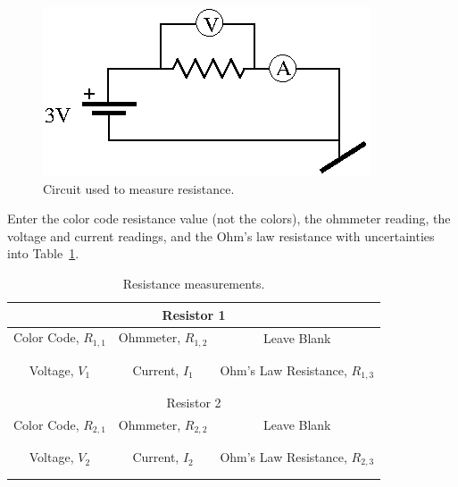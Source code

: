 \begin{figure}[htb]
\centering \epsfxsize=6cm \includegraphics[scale=1.5]{2_dc/procresist.eps}
\caption{Circuit used to measure resistance.}
\label{fig:DC:procresist}
\end{figure} 

\noindent Enter the color code resistance value (not the colors), the ohmmeter reading,
the voltage and current readings, and the Ohm's law resistance  with 
uncertainties into Table~\ref{tab:DC:resistmeas}.
\begin{table}[h]
\begin{center}
\begin{tabular}{|c|c|c|}
\hline
\multicolumn{3}{|c|}{Resistor 1} \\
\hline 
Color Code, $R_{1,1}$ & Ohmmeter, $R_{1,2}$ & Leave Blank\\ 
\hline
\hspace*{3cm} & \hspace*{3cm} & \hspace*{3cm} \\ 
& &  \\ 
\hline
Voltage, $V_1$ & Current, $I_1$ & Ohm's Law Resistance, $R_{1,3}$ \\
\hline
& &  \\
& &  \\
\hline
\hline
\multicolumn{3}{|c|}{Resistor 2} \\
\hline 
Color Code, $R_{2,1}$ & Ohmmeter, $R_{2,2}$ & Leave Blank\\ 
\hline
\hspace*{3cm} & \hspace*{3cm} & \hspace*{3cm} \\ 
& &  \\ 
\hline
Voltage, $V_2$ & Current, $I_2$ & Ohm's Law Resistance, $R_{2,3}$ \\
\hline
& &  \\
& &  \\
\hline
\end{tabular}
\end{center}
\caption{Resistance measurements.}
\label{tab:DC:resistmeas}
\end{table}
\vfill
\pagebreak

